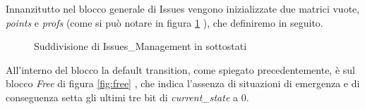 \documentclass{article}
\begin{document}
            Innanzitutto nel blocco generale di Issues vengono inizializzate due matrici vuote, \emph{points} e \emph{profs} (come si può notare in figura \ref{fig:iss} ), che definiremo in seguito.

            \begin{figure} [ht]
                \caption{Suddivisione di Issues\_Management in sottostati}
                \label{fig:iss}
            \end{figure}

            All'interno del blocco la default transition, come spiegato precedentemente, è sul blocco \emph{Free} di figura \ref{fig:free} , che indica l'assenza di situazioni di emergenza
            e di conseguenza setta gli ultimi tre bit di \emph{current\_state} a 0.
\end{document}
